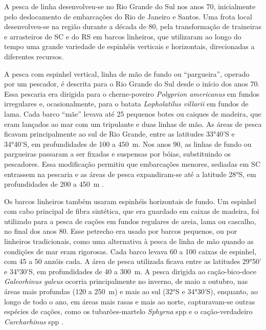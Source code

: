 \documentclass[a4paper,11pt,twoside,showtrims,onecolumn,openright,final]{memoir}
\begin{document}
A pesca de linha desenvolveu-se no Rio Grande do Sul nos anos 70, inicialmente pelo 
deslocamento de embarcações do Rio de Janeiro e Santos. Uma frota local desenvolveu-se 
na região durante a década de 80, pela transformação de traineiras e arrasteiros de SC e 
do RS em barcos linheiros, que utilizaram ao longo do tempo uma grande variedade de 
espinhéis verticais e horizontais, direcionadas a diferentes recursos. 

A pesca com espinhel vertical, linha de mão de fundo ou ``pargueira'', operado por um pescador, 
é descrita para o Rio Grande do Sul desde o início dos anos 70. Essa pescaria era dirigida 
para o cherne-poveiro \emph{Polyprion americanus} em fundos irregulares e, ocasionalmente, para 
o batata \emph{Lopholatilus villarii} em fundos de lama. Cada barco ``mãe'' levava até 25 pequenos botes 
ou caiques de madeira, que eram lançados ao mar com um tripulante e duas linhas de mão. As áreas 
de pesca ficavam principalmente ao sul de Rio Grande, entre as latitudes 33°40'S e 34°40'S, 
em profundidades de 100 a 450~m. Nos anos 90, as linhas de fundo ou pargueiras passaram a 
ser fixadas e suspensas por bóias, substituindo os pescadores. Essa modificação permitiu que 
embarcações menores, sediadas em SC entrassem na pescaria e as áreas de pesca expandiram-se 
até a latitude 28°S, em profundidades de 200 a 450~m \citep{PERES1998}. %

Os barcos linheiros também usaram espinhéis horizontais de fundo. Um espinhel com cabo 
principal de fibra sintética, que era guardado em caixas de madeira, foi utilizado para 
a pesca de cações em fundos regulares de areia, lama ou cascalho, no final dos anos 80. 
Esse petrecho era usado por barcos pequenos, ou por linheiros tradicionais, como uma 
alternativa à pesca de linha de mão quando as condições de mar eram rigorosas. Cada barco 
levava 60 a 100 caixas de espinhel, com 45 a 50 anzóis cada. A área de pesca utilizada 
ficava entre as latitudes 29°50' e 34°30'S, em profundidades de 40 a 300~m. A pesca 
dirigida ao cação-bico-doce \emph{Galeorhinus galeus} ocorria principalmente no inverno, de maio 
a outubro, nas áreas mais profundas (120 a 250~m) e mais ao sul (32°S e 34°30'S), enquanto, 
ao longo de todo o ano, em áreas mais rasas e mais ao norte, capturavam-se outras espécies 
de cações, como os tubarões-martelo \emph{Sphyrna} spp 
e o cação-verdadeiro \emph{Carcharhinus} spp \citep{peres1991b}.
\end{document}

